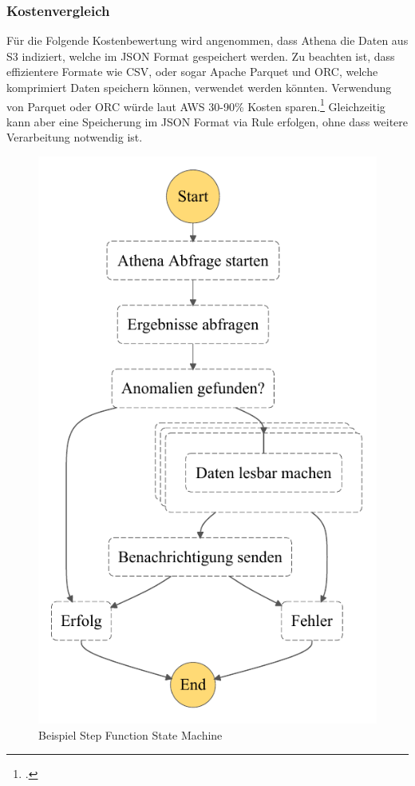 \subsubsection{Kostenvergleich}
Für die Folgende Kostenbewertung wird angenommen, dass Athena die Daten aus \ac{S3} indiziert, welche im \ac{JSON} Format gespeichert werden. Zu beachten ist, dass effizientere Formate wie CSV, oder sogar Apache Parquet und ORC, welche komprimiert Daten speichern können, verwendet werden  könnten. Verwendung von Parquet oder ORC würde laut \ac{AWS} 30-90\% Kosten sparen.\footcite[Vgl.][]{AmazonWebServicesInc..o.J.t} Gleichzeitig kann aber eine Speicherung im \ac{JSON} Format via \AWSIOT{} Rule erfolgen, ohne dass weitere Verarbeitung notwendig ist.


\begin{figure}[H]
\centering
\includegraphics[height=0.45\textheight]{graphics/Step-Function-Athena.pdf}
\caption{Beispiel Step Function State Machine}
\label{abb:StepFunctionExample}
\end{figure}

